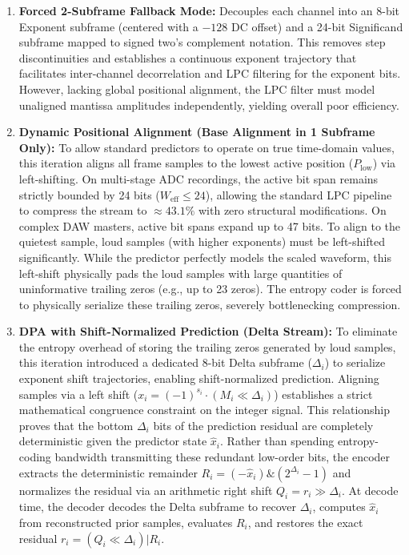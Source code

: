 \documentclass[10pt,twocolumn]{article}
\begin{document}
\begin{enumerate}
	\item \textbf{Forced 2-Subframe Fallback Mode:} Decouples each channel into an 8-bit Exponent subframe (centered with a $-128$ DC offset) and a 24-bit Significand subframe mapped to signed two's complement notation. This removes step discontinuities and establishes a continuous exponent trajectory that facilitates inter-channel decorrelation and LPC filtering for the exponent bits. However, lacking global positional alignment, the LPC filter must model unaligned mantissa amplitudes independently, yielding overall poor efficiency.

	\item \textbf{Dynamic Positional Alignment (Base Alignment in 1 Subframe Only):} To allow standard predictors to operate on true time-domain values, this iteration aligns all frame samples to the lowest active position ($P_{\text{low}}$) via left-shifting. On multi-stage ADC recordings, the active bit span remains strictly bounded by 24 bits ($W_{\text{eff}} \le 24$), allowing the standard LPC pipeline to compress the stream to $\approx 43.1\%$ with zero structural modifications. On complex DAW masters, active bit spans expand up to 47 bits. To align to the quietest sample, loud samples (with higher exponents) must be left-shifted significantly. While the predictor perfectly models the scaled waveform, this left-shift physically pads the loud samples with large quantities of uninformative trailing zeros (e.g., up to 23 zeros). The entropy coder is forced to physically serialize these trailing zeros, severely bottlenecking compression.

	\item \textbf{DPA with Shift-Normalized Prediction (Delta Stream):} To eliminate the entropy overhead of storing the trailing zeros generated by loud samples, this iteration introduced a dedicated 8-bit Delta subframe ($\Delta_i$) to serialize exponent shift trajectories, enabling shift-normalized prediction. Aligning samples via a left shift ($x_i=(-1)^{s_i}\cdot(M_i\ll\Delta_i)$) establishes a strict mathematical congruence constraint on the integer signal. This relationship proves that the bottom $\Delta_i$ bits of the prediction residual are completely deterministic given the predictor state $\hat{x}_i$. Rather than spending entropy-coding bandwidth transmitting these redundant low-order bits, the encoder extracts the deterministic remainder $R_i=(-\hat{x}_i)\&(2^{\Delta_i}-1)$ and normalizes the residual via an arithmetic right shift $Q_i=r_i\gg\Delta_i$. At decode time, the decoder decodes the Delta subframe to recover $\Delta_i$, computes $\hat{x}_i$ from reconstructed prior samples, evaluates $R_i$, and restores the exact residual $r_i=(Q_i\ll\Delta_i)|R_i$.


\end{enumerate}
\end{document}
